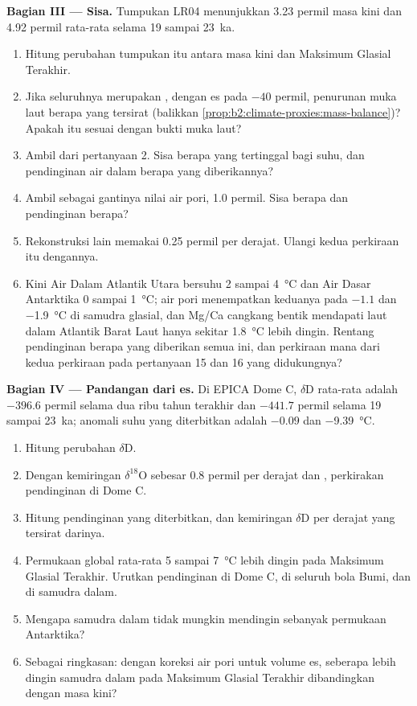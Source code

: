 \begin{problem}
\medskip\noindent\textbf{Bagian III --- Sisa.}
Tumpukan LR04 menunjukkan \num{3.23} permil masa kini dan \num{4.92} permil rata-rata selama 19 sampai
\qty{23}{ka}.
\begin{enumerate}[resume]
  \item Hitung perubahan tumpukan itu antara masa kini dan Maksimum Glasial Terakhir.
  \item Jika seluruhnya merupakan , dengan es pada $-40$ permil, penurunan muka laut berapa yang
        tersirat (balikkan \cref{prop:b2:climate-proxies:mass-balance})? Apakah itu sesuai dengan
        bukti muka laut?
  \item Ambil  dari pertanyaan 2. Sisa berapa yang tertinggal bagi suhu, dan
        pendinginan air dalam berapa yang diberikannya?
  \item Ambil sebagai gantinya nilai air pori, \num{1.0} permil. Sisa berapa dan pendinginan berapa?
  \item Rekonstruksi lain memakai \num{0.25} permil per derajat. Ulangi kedua perkiraan itu dengannya.
  \item Kini Air Dalam Atlantik Utara bersuhu 2 sampai \qty{4}{\celsius} dan Air Dasar
        Antarktika 0 sampai \qty{1}{\celsius}; air pori menempatkan keduanya pada $-1.1$ dan \qty{-1.9}{\celsius}
        di samudra glasial, dan Mg/Ca cangkang bentik mendapati laut dalam Atlantik Barat Laut
        hanya sekitar \qty{1.8}{\celsius} lebih dingin. Rentang pendinginan berapa yang diberikan semua ini, dan perkiraan mana
        dari kedua perkiraan pada pertanyaan 15 dan 16 yang didukungnya?
\end{enumerate}

\medskip\noindent\textbf{Bagian IV --- Pandangan dari es.}
Di EPICA Dome C, $\delta$D rata-rata adalah $-396.6$ permil selama dua ribu tahun terakhir dan
$-441.7$ permil selama 19 sampai \qty{23}{ka}; anomali suhu yang diterbitkan adalah $-0.09$ dan
\qty{-9.39}{\celsius}.
\begin{enumerate}[resume]
  \item Hitung perubahan $\delta$D.
  \item Dengan kemiringan $\delta^{18}$O sebesar \num{0.8} permil per derajat dan ,
        perkirakan pendinginan di Dome C.
  \item Hitung pendinginan yang diterbitkan, dan kemiringan $\delta$D per derajat yang tersirat darinya.
  \item Permukaan global rata-rata 5 sampai \qty{7}{\celsius} lebih dingin pada Maksimum Glasial Terakhir.
        Urutkan pendinginan di Dome C, di seluruh bola Bumi, dan di samudra dalam.
  \item Mengapa samudra dalam tidak mungkin mendingin sebanyak permukaan Antarktika?
  \item Sebagai ringkasan: dengan koreksi air pori untuk volume es, seberapa lebih dingin samudra dalam
        pada Maksimum Glasial Terakhir dibandingkan dengan masa kini?
\end{enumerate}
\end{problem}
